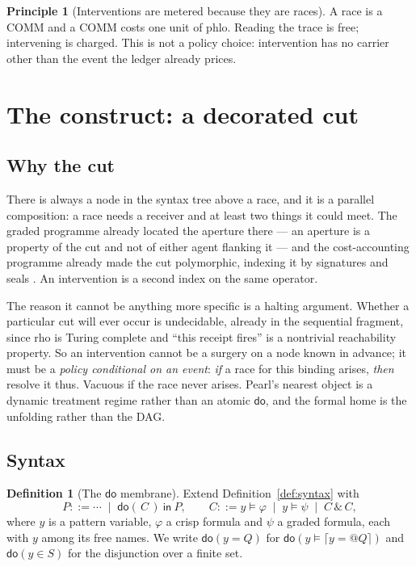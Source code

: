 \documentclass[11pt,a4paper]{article}
\theoremstyle{plain}
\theoremstyle{definition}
\newtheorem{definition}[theorem]{Definition}
\newtheorem{principle}[theorem]{Principle}
\theoremstyle{remark}
\newcommand{\rhoc}{\textsf{rho}}
\newcommand{\crisp}[1]{\lceil #1 \rceil}
\newcommand{\dok}{\textsf{do}}
\newcommand{\ink}{\textsf{in}}
\begin{document}
\begin{principle}[Interventions are metered because they are races]
\label{prin:metered}
A race is a COMM and a COMM costs one unit of phlo. Reading the trace is free;
intervening is charged. This is not a policy choice: intervention has no
carrier other than the event the ledger already prices.
\end{principle}

\section{The construct: a decorated cut}\label{sec:construct}

\subsection{Why the cut}

There is always a node in the syntax tree above a race, and it is a parallel
composition: a race needs a receiver and at least two things it could meet. The
graded programme already located the aperture there --- an aperture is a
property of the cut and not of either agent flanking it
\cite[Rem.~2.3]{GradedV4} --- and the cost-accounting programme already made the
cut polymorphic, indexing it by signatures and seals \cite{CostMonad}. An
intervention is a second index on the same operator.

The reason it cannot be anything more specific is a halting argument. Whether
a particular cut will ever occur is undecidable, already in the sequential
fragment, since \rhoc{} is Turing complete and ``this receipt fires'' is a
nontrivial reachability property. So an intervention cannot be a surgery on a
node known in advance; it must be a \emph{policy conditional on an event}:
\emph{if} a race for this binding arises, \emph{then} resolve it thus. Vacuous
if the race never arises. Pearl's nearest object is a dynamic treatment regime
rather than an atomic $\dok$, and the formal home is the unfolding rather than
the DAG.

\subsection{Syntax}

\begin{definition}[The $\dok$ membrane]\label{def:do}
Extend Definition~\ref{def:syntax} with
\[
  P ::= \cdots \;\mid\; \dok(\,C\,)\ \ink\ P, \qquad
  C ::= y \models \varphi \;\mid\; y \models \psi \;\mid\; C \,\&\, C ,
\]
where $y$ is a pattern variable, $\varphi$ a crisp formula and $\psi$ a graded
formula, each with $y$ among its free names. We write $\dok(y = Q)$ for
$\dok(y \models \crisp{y = @Q})$ and $\dok(y \in S)$ for the disjunction over a
finite set.
\end{definition}
\end{document}
